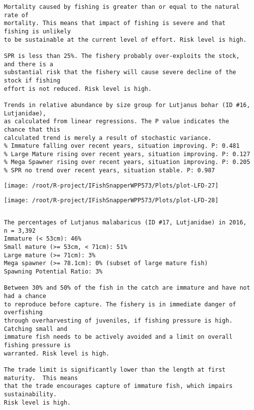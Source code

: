 \documentclass{report}\usepackage[]{graphicx}\usepackage[]{color}
\makeatletter
\def\maxwidth{ %
  \ifdim\Gin@nat@width>\linewidth
    \linewidth
  \else
    \Gin@nat@width
  \fi
}
\newenvironment{kframe}{%
 \def\at@end@of@kframe{}%
 \ifinner\ifhmode%
  \def\at@end@of@kframe{\end{minipage}}%
  \begin{minipage}{\columnwidth}%
 \fi\fi%
 \def\FrameCommand##1{\hskip\@totalleftmargin \hskip-\fboxsep
 \colorbox{shadecolor}{##1}\hskip-\fboxsep
     \hskip-\linewidth \hskip-\@totalleftmargin \hskip\columnwidth}%
 \MakeFramed {\advance\hsize-\width
   \@totalleftmargin\z@ \linewidth\hsize
   \@setminipage}}%
 {\par\unskip\endMakeFramed%
 \at@end@of@kframe}
\newenvironment{knitrout}{}{} %
\makeatother
\begin{document}
\begin{knitrout}
\begin{kframe}
\begin{verbatim}
Mortality caused by fishing is greater than or equal to the natural rate of
mortality. This means that impact of fishing is severe and that fishing is unlikely
to be sustainable at the current level of effort. Risk level is high.
 
SPR is less than 25%. The fishery probably over-exploits the stock, and there is a
substantial risk that the fishery will cause severe decline of the stock if fishing
effort is not reduced. Risk level is high.
 
Trends in relative abundance by size group for Lutjanus bohar (ID #16, Lutjanidae),
as calculated from linear regressions. The P value indicates the chance that this
calculated trend is merely a result of stochastic variance.
% Immature falling over recent years, situation improving. P: 0.481
% Large Mature rising over recent years, situation improving. P: 0.127
% Mega Spawner rising over recent years, situation improving. P: 0.205
% SPR no trend over recent years, situation stable. P: 0.987
\end{verbatim}
\end{kframe}
\texttt{[image: /root/R-project/IFishSnapperWPP573/Plots/plot-LFD-27]} 

\texttt{[image: /root/R-project/IFishSnapperWPP573/Plots/plot-LFD-28]} 
\begin{kframe}\begin{verbatim}
\end{verbatim}
\end{kframe}
\clearpage
\newpage
\begin{kframe}\begin{verbatim}The percentages of Lutjanus malabaricus (ID #17, Lutjanidae) in 2016, n = 3,392
Immature (< 53cm): 46%
Small mature (>= 53cm, < 71cm): 51%
Large mature (>= 71cm): 3%
Mega spawner (>= 78.1cm): 0% (subset of large mature fish)
Spawning Potential Ratio: 3%
 
Between 30% and 50% of the fish in the catch are immature and have not had a chance
to reproduce before capture. The fishery is in immediate danger of overfishing
through overharvesting of juveniles, if fishing pressure is high.  Catching small and
immature fish needs to be actively avoided and a limit on overall fishing pressure is
warranted. Risk level is high.

The trade limit is significantly lower than the length at first maturity.  This means
that the trade encourages capture of immature fish, which impairs sustainability.
Risk level is high.


\end{verbatim}
\end{kframe}
\end{knitrout}
\end{document}
